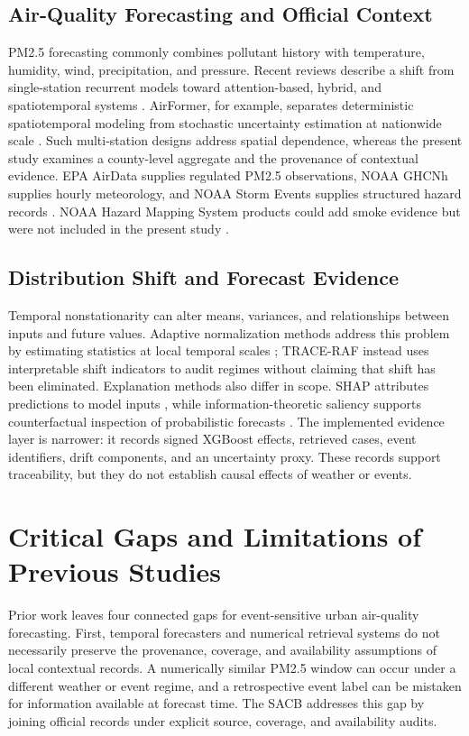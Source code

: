\documentclass{ieeeaccess}
\begin{document}
\subsection{Air-Quality Forecasting and Official Context}
PM2.5 forecasting commonly combines pollutant history with temperature,
humidity, wind, precipitation, and pressure. Recent reviews describe a shift
from single-station recurrent models toward attention-based, hybrid, and
spatiotemporal systems \cite{zhou2024pm25review,zhang2023sparsepm25}. AirFormer,
for example, separates deterministic spatiotemporal modeling from stochastic
uncertainty estimation at nationwide scale \cite{liang2023airformer}. Such
multi-station designs address spatial dependence, whereas the present study
examines a county-level aggregate and the provenance of contextual evidence.
EPA AirData supplies regulated PM2.5 observations, NOAA GHCNh supplies hourly
meteorology, and NOAA Storm Events supplies structured
hazard records \cite{epaairdata2026,noaaisd2026,noaastormevents2026}. NOAA
Hazard Mapping System products could add smoke evidence but were not included in
the present study \cite{noaahms2026}.

\subsection{Distribution Shift and Forecast Evidence}
Temporal nonstationarity can alter means, variances, and relationships between
inputs and future values. Adaptive normalization methods address this problem by
estimating statistics at local temporal scales \cite{liu2023san}; TRACE-RAF
instead uses interpretable shift indicators to audit regimes without claiming
that shift has been eliminated. Explanation methods also differ in scope. SHAP
attributes predictions to model inputs \cite{lundberg2017shap}, while
information-theoretic saliency supports counterfactual inspection of
probabilistic forecasts \cite{raman2023forecast}. The implemented evidence
layer is narrower: it records signed XGBoost effects, retrieved cases, event
identifiers, drift components, and an uncertainty proxy. These records support
traceability, but they do not establish causal effects of weather or events.
\section{Critical Gaps and Limitations of Previous Studies}

Prior work leaves four connected gaps for event-sensitive urban air-quality
forecasting. First, temporal forecasters and numerical retrieval systems do not
necessarily preserve the provenance, coverage, and availability assumptions of
local contextual records. A numerically similar PM2.5 window can occur under a
different weather or event regime, and a retrospective event label can be
mistaken for information available at forecast time. The SACB addresses this
gap by joining official records under explicit source, coverage, and
availability audits.
\end{document}
